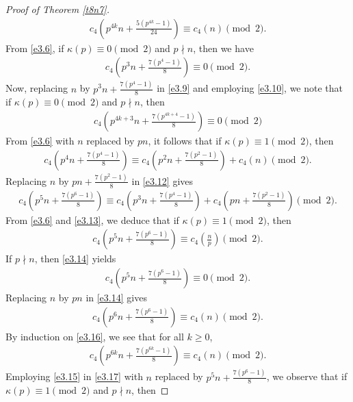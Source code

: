 \documentclass[11pt,a4paper]{article}
\numberwithin{equation}{section}
\theoremstyle{plain}
\begin{document}
\begin{proof}[Proof of Theorem \ref{t8n7}\unskip]
\begin{align}
			c_4\displaystyle\left(p^{4k}n+\frac{5(p^{4k}-1)}{24}\right)\equiv c_4(n)\pmod2.	
		\end{align}
		From \eqref{e3.6}, if $\kappa(p)\equiv0\pmod2$ and $p\nmid n$, then we have
		\begin{align}\label{e3.10}
			c_4\displaystyle\left(p^3n+\frac{7(p^4-1)}{8}\right)\equiv0\pmod2.
		\end{align}
		Now, replacing $n$ by $p^3n+\frac{7(p^4-1)}{8}$ in \eqref{e3.9} and employing \eqref{e3.10}, we note that if $\kappa(p)\equiv 0\pmod 2$ and $p\nmid n$, then
		\begin{align}\label{e3.11}
			c_4\displaystyle\left(p^{4k+3}n+\frac{7(p^{4k+4}-1)}{8}\right)\equiv0\pmod2
		\end{align}
		From \eqref{e3.6} with $n$ replaced by $pn$, it follows that if $\kappa(p)\equiv 1\pmod 2$, then
		\begin{align}\label{e3.12}
			c_4\displaystyle\left(p^4n+\frac{7(p^4-1)}{8}\right)\equiv c_4\displaystyle\left(p^2n+\frac{7(p^2-1)}{8}\right)+c_4(n)\pmod 2.
		\end{align}
		Replacing $n$ by $pn+\frac{7(p^2-1)}{8}$ in \eqref{e3.12} gives
		\begin{align}\label{e3.13}
			c_4\displaystyle\left(p^5n+\frac{7(p^6-1)}{8}\right)\equiv c_4\displaystyle\left(p^3n+\frac{7(p^4-1)}{8}\right)+c_4\displaystyle\left(pn+\frac{7(p^2-1)}{8}\right)\pmod 2.
		\end{align}
		From \eqref{e3.6} and \eqref{e3.13}, we deduce that if $\kappa(p)\equiv 1\pmod 2$, then
		\begin{align}\label{e3.14}
			c_4\displaystyle\left(p^5n+\frac{7(p^6-1)}{8}\right)\equiv c_4\displaystyle\left(\frac{n}{p}\right) \pmod 2.
		\end{align}
		If $p\nmid n$, then \eqref{e3.14} yields
		\begin{align}\label{e3.15}
			c_4\displaystyle\left(p^5n+\frac{7(p^6-1)}{8}\right)\equiv0\pmod 2.
		\end{align}
		Replacing $n$ by $pn$ in \eqref{e3.14} gives
		\begin{align}\label{e3.16}
			c_4\displaystyle\left(p^6n+\frac{7(p^6-1)}{8}\right)\equiv c_4(n) \pmod 2.
		\end{align}
		By induction on \eqref{e3.16}, we see that for all $k\ge0$,
		\begin{align}\label{e3.17}
			c_4\displaystyle\left(p^{6k}n+\frac{7(p^{6k}-1)}{8}\right)\equiv c_4(n) \pmod 2.
		\end{align}
		Employing \eqref{e3.15} in \eqref{e3.17} with $n$ replaced by $p^5n+\frac{7(p^6-1)}{8}$, we observe that if $\kappa(p)\equiv 1\pmod 2$ and $p\nmid n$, then

\end{proof}
\end{document}
